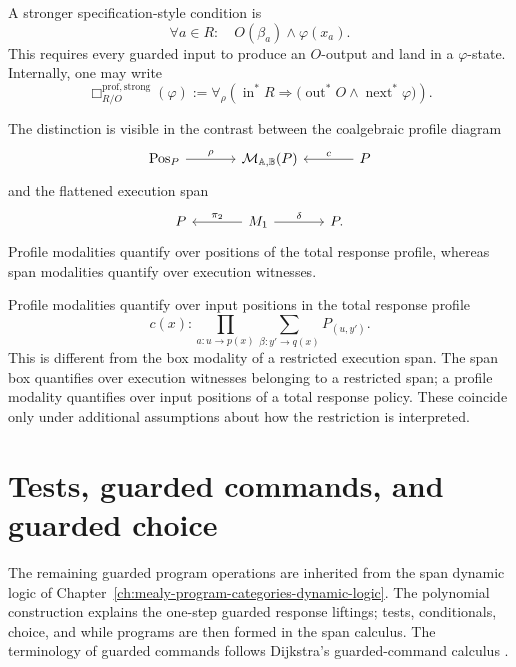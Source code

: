 A stronger specification-style condition is
\[
\forall a\in R:
\quad
O(\beta_a)\wedge \varphi(x_a).
\]
This requires every guarded input to produce an \(O\)-output and land in a
\(\varphi\)-state. Internally, one may write
\[
\Box^{\mathrm{prof,strong}}_{R/O}(\varphi)
:=
\forall_\rho
\left(
\operatorname{in}^{\ast}R
\Rightarrow
\bigl(
\operatorname{out}^{\ast}O
\wedge
\operatorname{next}^{\ast}\varphi
\bigr)
\right).
\]

The distinction is visible in the contrast between the coalgebraic
profile diagram
\[
\begin{tikzcd}[column sep=large]
\mathrm{Pos}_P
  \arrow[r, "\rho"]
&
\mathcal M_{\mathbb A,\mathbb B}(P)
&
P
  \arrow[l, "c"']
\end{tikzcd}
\]
and the flattened execution span
\[
\begin{tikzcd}[column sep=large]
P
&
M_1
  \arrow[l, "\pi_2"']
  \arrow[r, "\delta"]
&
P .
\end{tikzcd}
\]
Profile modalities quantify over positions of the total response profile,
whereas span modalities quantify over execution witnesses.

\begin{remark}
\label{rem:profile-modalities-versus-span-boxes}
Profile modalities quantify over input positions in the total response
profile
\[
c(x):
\prod_{a:u\to p(x)}
\sum_{\beta:y'\to q(x)}
P_{(u,y')}.
\]
This is different from the box modality of a restricted execution span.
The span box quantifies over execution witnesses belonging to a restricted
span; a profile modality quantifies over input positions of a total
response policy. These coincide only under additional assumptions about
how the restriction is interpreted.
\end{remark}

\section{Tests, guarded commands, and guarded choice}
\label{sec:tests-guarded-commands-guarded-choice}

The remaining guarded program operations are inherited from the span
dynamic logic of Chapter~\ref{ch:mealy-program-categories-dynamic-logic}.
The polynomial construction explains the one-step guarded response
liftings; tests, conditionals, choice, and while programs are then formed
in the span calculus. The terminology of guarded commands follows
Dijkstra's guarded-command calculus \cite{DijkstraGuardedCommands}.

